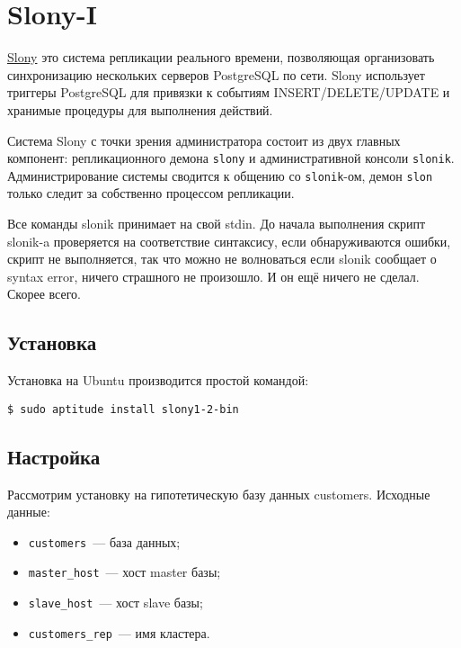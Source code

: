\section{Slony-I}
\label{sec:slonyI}

\href{http://slony.info/}{Slony} это система репликации реального времени, позволяющая организовать синхронизацию нескольких серверов PostgreSQL по сети. Slony использует триггеры PostgreSQL для привязки к событиям INSERT/DELETE/UPDATE и хранимые процедуры для выполнения действий.

Система Slony с точки зрения администратора состоит из двух главных компонент: репликационного демона \lstinline!slony! и административной консоли \lstinline!slonik!. Администрирование системы сводится к общению со \lstinline!slonik!-ом, демон \lstinline!slon! только следит за собственно процессом репликации.

Все команды slonik принимает на свой stdin. До начала выполнения скрипт slonik-a проверяется на соответствие синтаксису, если обнаруживаются ошибки, скрипт не выполняется, так что можно не волноваться если slonik сообщает о syntax error, ничего страшного не произошло. И он ещё ничего не сделал. Скорее всего.

\subsection{Установка}

Установка на Ubuntu производится простой командой:

\begin{lstlisting}[label=lst:slony1,caption=Установка]
$ sudo aptitude install slony1-2-bin
\end{lstlisting}

\subsection{Настройка}
\label{subsec:slonyI-settings}

Рассмотрим установку на гипотетическую базу данных customers. Исходные данные:

\begin{itemize}
  \item \lstinline!customers!~--- база данных;
  \item \lstinline!master_host!~--- хост master базы;
  \item \lstinline!slave_host!~--- хост slave базы;
  \item \lstinline!customers_rep!~--- имя кластера.
\end{itemize}

